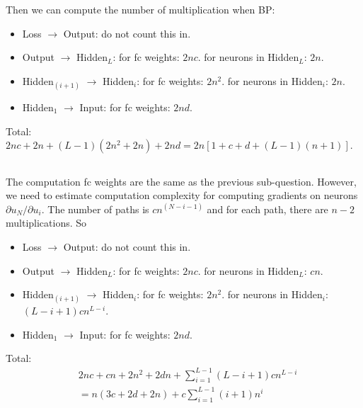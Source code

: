 Then we can compute the number of multiplication when BP:

\begin{itemize}
    \item Loss $\to$ Output: do not count this in.
    \item Output $\to$ Hidden$_{L}$:
        for fc weights: $2nc$.
        for neurons in Hidden$_{L}$: $2n$.
    \item Hidden$_{(i+1)}$ $\to$ Hidden$_{i}$:
        for fc weights: $2n^2$.
        for neurons in Hidden$_{i}$: $2n$.
    \item Hidden$_{1}$ $\to$ Input:
        for fc weights: $2nd$.
\end{itemize}

Total: $2nc+2n+(L-1)(2n^2+2n)+2nd=2n[1+c+d+(L-1)(n+1)]$.

\subsection{} %

The computation fc weights are the same as the previous sub-question.
However,
we need to estimate computation complexity for computing
gradients on neurons $\partial u_N/\partial u_i$.
The number of paths is $cn^{(N-i-1)}$
and for each path,
there are $n-2$ multiplications.
So

\begin{itemize}
    \item Loss $\to$ Output: do not count this in.
    \item Output $\to$ Hidden$_{L}$:
        for fc weights: $2nc$.
        for neurons in Hidden$_{L}$: $cn$.
    \item Hidden$_{(i+1)}$ $\to$ Hidden$_{i}$:
        for fc weights: $2n^2$.
        for neurons in Hidden$_{i}$: $(L-i+1)cn^{L-i}$.
    \item Hidden$_{1}$ $\to$ Input:
        for fc weights: $2nd$.
\end{itemize}

Total:
\begin{equation}
\begin{split}
    & 2nc+cn+2n^2+2dn+\sum_{i=1}^{L-1}(L-i+1)cn^{L-i} \\
    & = n(3c+2d+2n) + c\sum_{i=1}^{L-1}(i+1)n^i
\end{split}
\end{equation}
